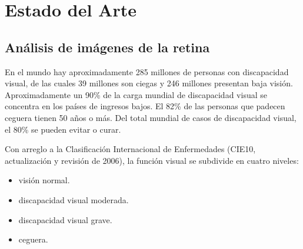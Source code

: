 \chapter{Estado del Arte} %

\label{Chapter2} %


\section{An\'alisis de im\'agenes de la retina}

En el mundo hay aproximadamente 285 millones \cite{oms:cifras} de personas con discapacidad visual, de las cuales 39 millones son ciegas y 246 millones presentan baja visi\'on. Aproximadamente un 90\% de la carga mundial de discapacidad visual se concentra en los pa\'ises de ingresos bajos.
El 82\% de las personas que padecen ceguera tienen 50 años o m\'as. Del total mundial de casos de discapacidad visual, el 80\%  se pueden evitar o curar.

Con arreglo a la Clasificaci\'on Internacional de Enfermedades (CIE10, actualizaci\'on y revisi\'on de 2006), la funci\'on visual se subdivide en cuatro niveles:
\begin{itemize}
\item visi\'on normal.
\item discapacidad visual moderada.
\item discapacidad visual grave.
\item ceguera.
\end{itemize}


